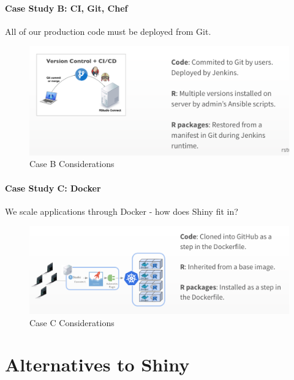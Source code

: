 \documentclass[]{book}
\theoremstyle{definition}
\theoremstyle{definition}
\theoremstyle{definition}
\theoremstyle{remark}
\begin{document}
\hypertarget{case-study-b-ci-git-chef}{%
\subsubsection{Case Study B: CI, Git,
Chef}\label{case-study-b-ci-git-chef}}

All of our production code must be deployed from Git.

\begin{figure}
\centering
\includegraphics{imgs/case-studies/case-b.png}
\caption{Case B Considerations}
\end{figure}

\hypertarget{case-study-c-docker}{%
\subsubsection{Case Study C: Docker}\label{case-study-c-docker}}

We scale applications through Docker - how does Shiny fit in?

\begin{figure}
\centering
\includegraphics{imgs/case-studies/case-c.png}
\caption{Case C Considerations}
\end{figure}

\hypertarget{alternatives-to-shiny}{%
\chapter{Alternatives to Shiny}\label{alternatives-to-shiny}}
\end{document}
